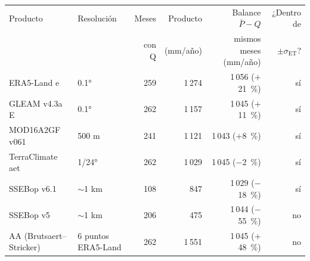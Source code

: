 \begin{tabular}{llrrrr}
\toprule
Producto & Resolución & Meses & Producto & Balance $\bar{P} - Q$ & ¿Dentro de \\
 & & con Q & (mm/año) & mismos meses (mm/año) & $\pm\sigma_\mathrm{ET}$? \\
\midrule
ERA5-Land e & 0.1° & 259 & 1\,274 & 1\,056 ($+$21~\%) & sí \\
GLEAM v4.3a E & 0.1° & 262 & 1\,157 & 1\,045 ($+$11~\%) & sí \\
MOD16A2GF v061 & 500 m & 241 & 1\,121 & 1\,043 ($+$8~\%) & sí \\
TerraClimate aet & 1/24° & 262 & 1\,029 & 1\,045 ($-$2~\%) & sí \\
SSEBop v6.1 & $\sim$1 km & 108 & 847 & 1\,029 ($-$18~\%) & sí \\
SSEBop v5 & $\sim$1 km & 206 & 475 & 1\,044 ($-$55~\%) & no \\
AA (Brutsaert–Stricker) & 6 puntos ERA5-Land & 262 & 1\,551 & 1\,045 ($+$48~\%) & no \\
\bottomrule
\end{tabular}
